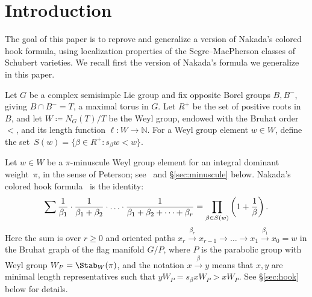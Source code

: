 \section{Introduction} The goal of this paper is to reprove and generalize a version of 
Nakada's colored hook formula, using localization properties of the Segre--MacPherson 
classes of Schubert varieties. We recall first the version of Nakada's formula we generalize in this paper.

Let $G$ be a complex semisimple Lie group and fix opposite Borel groups $B,B^-$, giving  
$B \cap B^- = T$, a maximal torus in $G$. Let $R^+$ be the set of positive roots in~$B$, and let $W\coloneqq N_G(T)/T$ be
the Weyl group, endowed with the Bruhat order~$<$, and its length function $\ell: W \to \mathbb{N}$. For a Weyl 
group element $w \in W$, define the set~$S(w) = \{ \beta \in R^+: s_\beta w < w \}$. 

Let $w\in W$ be a $\pi$-minuscule Weyl group element for an integral dominant weight~$\pi$, in the sense of Peterson;
see~\cite{proctor:bruhat,carrell:vector,proctor:minuscule,stembridge:fullycomm,stembridge2001minuscule,graham.kreiman:cominuscule_pt} 
and \S\ref{sec:minuscule} below. Nakada's colored hook formula~\cite{nakada:colored} is the identity:
\begin{equation}\label{E:Nakada-intro}
	\sum \frac{1}{\beta_1}\cdot \frac{1}{\beta_1+\beta_2}\cdot \ldots \cdot\frac{1}{\beta_1+\beta_2+\cdots +\beta_r}
	=\prod_{\beta\in S(w)}\left(1+\frac{1}{\beta}\right) \/.
\end{equation}
Here the sum is over $r \ge 0$ and
oriented paths $x_r\overset{\beta_r}{\to} x_{r-1}\to \ldots \to x_1\overset{\beta_1}{\to} x_0=w$
in the Bruhat graph of the flag manifold $G/P$, where $P$ is the parabolic group with Weyl group $W_P = \Stab_W(\pi)$,
and the notation $x \overset{\beta}{\to} y$ means that $x,y $ are minimal length representatives such that 
$y W_P= s_\beta x W_P >xW_P$. See \S\ref{sec:hook} below for details. 

